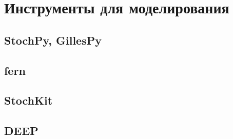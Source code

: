 \section{Инструменты для моделирования}
\subsection{StochPy, GillesPy}
\subsection{fern}
\subsection{StochKit}
\subsection{DEEP}
